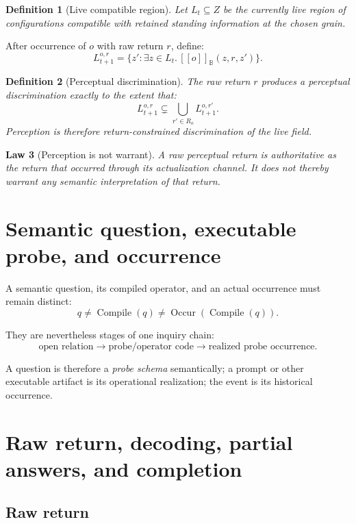 \documentclass[11pt,oneside]{article}
\newtheorem{definition}{Definition}[section]
\newtheorem{law}[definition]{Law}
\newcommand{\B}{\mathbb B}
\newcommand{\Compile}{\operatorname{Compile}}
\newcommand{\den}[1]{[\![#1]\!]}
\begin{document}
\begin{definition}[Live compatible region]
Let \(L_t\subseteq Z\) be the currently live region of configurations compatible with retained standing information at the chosen grain.
\end{definition}

After occurrence of \(o\) with raw return \(r\), define:
\[
\boxed{
L_{t+1}^{o,r}
=
\{
z':
\exists z\in L_t.\,
\den{o}_{\B}(z,r,z')
\}.
}
\]

\begin{definition}[Perceptual discrimination]
The raw return \(r\) produces a perceptual discrimination exactly to the extent that:
\[
L_{t+1}^{o,r}
\subsetneq
\bigcup_{r'\in R_o}L_{t+1}^{o,r'}.
\]
Perception is therefore return-constrained discrimination of the live field.
\end{definition}

\begin{law}[Perception is not warrant]
A raw perceptual return is authoritative as the return that occurred through its actualization channel.  It does not thereby warrant any semantic interpretation of that return.
\end{law}

\section{Semantic question, executable probe, and occurrence}

A semantic question, its compiled operator, and an actual occurrence must remain distinct:
\[
\boxed{
q
\neq
\Compile(q)
\neq
\operatorname{Occur}(\Compile(q)).
}
\]

They are nevertheless stages of one inquiry chain:
\[
\boxed{
\text{open relation}
\longrightarrow
\text{probe/operator code}
\longrightarrow
\text{realized probe occurrence}.
}
\]

A question is therefore a \emph{probe schema} semantically; a prompt or other executable artifact is its operational realization; the event is its historical occurrence.

\section{Raw return, decoding, partial answers, and completion}

\subsection{Raw return}
\end{document}
